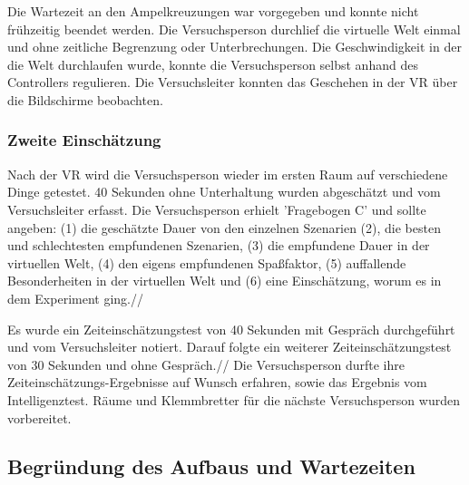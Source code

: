\documentclass{Paper}
\begin{document}
Die Wartezeit an den Ampelkreuzungen war vorgegeben und konnte nicht frühzeitig beendet werden. Die Versuchsperson durchlief die virtuelle Welt einmal und ohne zeitliche Begrenzung oder Unterbrechungen. Die Geschwindigkeit in der die Welt durchlaufen wurde, konnte die
Versuchsperson selbst anhand des Controllers regulieren. Die Versuchsleiter konnten das
Geschehen in der VR über die Bildschirme beobachten.

\subsubsection{Zweite Einschätzung}
Nach der VR wird die Versuchsperson wieder im ersten Raum auf verschiedene Dinge getestet.
40 Sekunden ohne
Unterhaltung wurden abgeschätzt und vom Versuchsleiter erfasst. Die Versuchsperson erhielt
'Fragebogen C' und sollte angeben: (1) die geschätzte Dauer von den einzelnen Szenarien
(2), die besten und schlechtesten empfundenen Szenarien, (3) die empfundene Dauer in
der virtuellen Welt, (4) den eigens empfundenen Spaßfaktor, (5) auffallende
Besonderheiten in der virtuellen Welt und (6) eine Einschätzung, worum es in dem
Experiment ging.//

Es wurde ein Zeiteinschätzungstest von 40 Sekunden mit Gespräch durchgeführt und vom
Versuchsleiter notiert. Darauf folgte ein weiterer Zeiteinschätzungstest von 30 Sekunden und
ohne Gespräch.//
Die Versuchsperson durfte ihre Zeiteinschätzungs-Ergebnisse auf Wunsch erfahren, sowie das Ergebnis vom
Intelligenztest. Räume und Klemmbretter für die nächste Versuchsperson wurden vorbereitet.

        \subsection{Begründung des Aufbaus und Wartezeiten}
\end{document}
